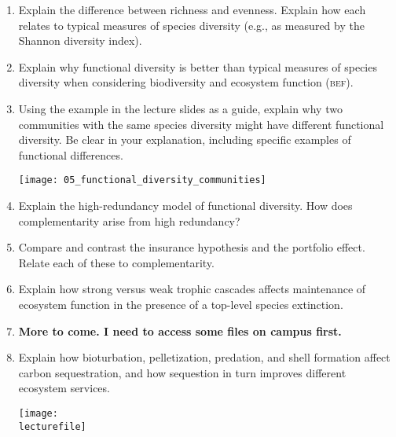 \documentclass[letterpaper]{tufte-handout}
\newcommand\lecturefile{434_lecture05_instructor}
\begin{document}
\begin{enumerate}

	\item Explain the difference between richness and evenness. Explain how each relates to typical measures of species diversity (e.g., as measured by the Shannon diversity index).
	
	\item Explain why functional diversity is better than typical measures of species diversity when considering biodiversity and ecosystem function (\textsc{bef}).
	
	\item Using the example in the lecture slides as a guide, explain why two communities with the same species diversity might have different functional diversity. Be clear in your explanation, including specific examples of functional differences.
	
	\begin{marginfigure}
		\texttt{[image: 05\_functional\_diversity\_communities]}
	\end{marginfigure}

	\item Explain the high-redundancy model of functional diversity. How does complementarity arise from high redundancy? 
	
	\item Compare and contrast the insurance hypothesis and the portfolio effect. Relate each of these to complementarity.
	
	\item Explain how strong versus weak trophic cascades affects maintenance of ecosystem function in the presence of a top-level species extinction.
	
	\item \textbf{More to come. I need to access some files on campus first.}\
	
	\item Explain how bioturbation, pelletization, predation, and shell formation affect carbon sequestration, and how sequestion in turn improves different ecosystem services.
	
	\begin{marginfigure}
		\texttt{[image: \\lecturefile]}
	\end{marginfigure}
		
	
\end{enumerate}
\end{document}
